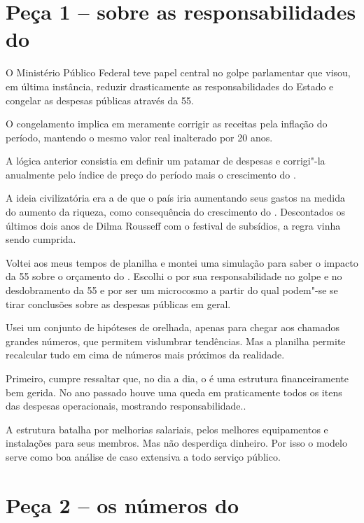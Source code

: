  

\section{Peça 1 -- sobre as responsabilidades do }

O Ministério Público Federal teve papel central no golpe parlamentar que
visou, em última instância, reduzir drasticamente as responsabilidades
do Estado e congelar as despesas públicas através da  55.

O congelamento implica em meramente corrigir as receitas pela inflação
do período, mantendo o mesmo valor real inalterado por 20 anos.

A lógica anterior consistia em definir um patamar de despesas e
corrigi"-la anualmente pelo índice de preço do período mais o crescimento
do .

A ideia civilizatória era a de que o país iria aumentando seus gastos na
medida do aumento da riqueza, como consequência do crescimento do .
Descontados os últimos dois anos de Dilma Rousseff com o festival de
subsídios, a regra vinha sendo cumprida.

Voltei aos meus tempos de planilha e montei uma simulação para saber o
impacto da  55 sobre o orçamento do . Escolhi o  por sua
responsabilidade no golpe e no desdobramento da  55 e por ser um
microcosmo a partir do qual podem"-se se tirar conclusões sobre as
despesas públicas em geral.

Usei um conjunto de hipóteses de orelhada, apenas para chegar aos
chamados grandes números, que permitem vislumbrar tendências. Mas a
planilha permite recalcular tudo em cima de números mais próximos da
realidade.

Primeiro, cumpre ressaltar que, no dia a dia, o  é uma estrutura
financeiramente bem gerida. No ano passado houve uma queda em
praticamente todos os itens das despesas operacionais, mostrando
responsabilidade..

A estrutura batalha por melhorias salariais, pelos melhores equipamentos
e instalações para seus membros. Mas não desperdiça dinheiro. Por isso o
modelo serve como boa análise de caso extensiva a todo serviço público.

\section{Peça 2 -- os números do }

